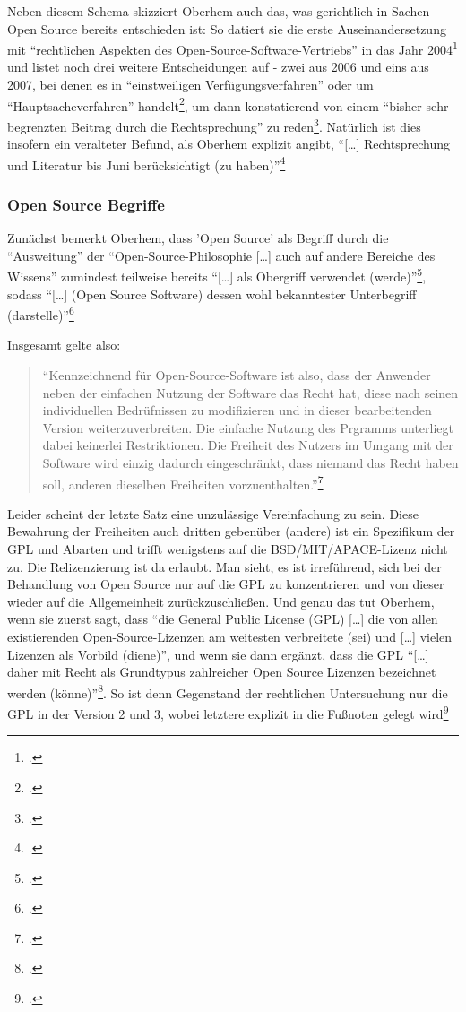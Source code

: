 \documentclass[DIV=calc,BCOR=5mm,11pt,headings=small,oneside,abstract=true, toc=bib]{scrartcl}
\begin{document}
Neben diesem Schema skizziert Oberhem auch das, was gerichtlich in Sachen Open
Source bereits entschieden ist: So datiert sie die erste
Auseinandersetzung mit \enquote{rechtlichen Aspekten des
Open-Source-Software-Vertriebs} in das Jahr
2004\footcite[vgl.][2]{Oberhem2008a} und listet noch drei weitere Entscheidungen
auf - zwei aus 2006 und eins aus 2007, bei denen es in
\enquote{einstweiligen Verfügungsverfahren} oder um
\enquote{Hauptsacheverfahren} handelt\footcite[vgl.][2f]{Oberhem2008a}, um
dann konstatierend von einem \enquote{bisher sehr begrenzten Beitrag durch
die Rechtsprechung} zu reden\footcite[vgl.][3]{Oberhem2008a}. Natürlich
ist dies insofern ein veralteter Befund, als Oberhem explizit angibt,
\enquote{[\ldots] Rechtsprechung und Literatur bis Juni berücksichtigt (zu
haben)}\footcite[vgl.][V = Vorwort]{Oberhem2008a}

\subsubsection{Open Source Begriffe}

Zunächst bemerkt Oberhem, dass 'Open Source' als Begriff durch die
\enquote{Ausweitung} der \enquote{Open-Source-Philosophie [\ldots] auch auf
andere Bereiche des Wissens} zumindest teilweise bereits \enquote{[\ldots]
als Obergriff verwendet (werde)}\footcite[vgl.][5]{Oberhem2008a}, sodass
\enquote{[\ldots] (Open Source Software) dessen wohl bekanntester Unterbegriff
(darstelle)}\footcite[vgl.][5f]{Oberhem2008a}

Insgesamt gelte also:

\begin{quote} \enquote{Kennzeichnend für Open-Source-Software ist also,
dass der Anwender neben der einfachen Nutzung der Software das Recht hat,
diese nach seinen individuellen Bedrüfnissen zu modifizieren und in
dieser bearbeitenden Version weiterzuverbreiten. Die einfache Nutzung des
Prgramms unterliegt dabei keinerlei Restriktionen. Die Freiheit des
Nutzers im Umgang mit der Software wird einzig dadurch eingeschränkt, dass
niemand das Recht haben soll, anderen dieselben Freiheiten
vorzuenthalten.}\footcite[vgl.][7]{Oberhem2008a}
\end{quote}

Leider scheint der letzte Satz eine unzulässige Vereinfachung zu sein. Diese
Bewahrung der Freiheiten auch dritten gebenüber (andere) ist ein Spezifikum der
GPL und Abarten und trifft wenigstens auf die BSD/MIT/APACE-Lizenz nicht zu. Die
Relizenzierung ist da erlaubt. Man sieht, es ist irreführend, sich bei der
Behandlung von Open Source nur auf die GPL zu konzentrieren und von dieser
wieder auf die Allgemeinheit zurückzuschließen. Und genau das tut Oberhem, wenn
sie zuerst sagt, dass \enquote{die General Public License (GPL) [\ldots] die von
allen existierenden Open-Source-Lizenzen am weitesten verbreitete (sei)
und [\ldots] vielen Lizenzen als Vorbild (diene)}, und wenn sie dann
ergänzt, dass die GPL \enquote{[\ldots] daher mit Recht als Grundtypus
zahlreicher Open Source Lizenzen bezeichnet werden
(könne)}\footcite[vgl.][33]{Oberhem2008a}. So ist denn Gegenstand der
rechtlichen Untersuchung nur die GPL in der Version 2 und 3, wobei letztere
explizit in die Fußnoten gelegt wird\footcite[vgl.][34]{Oberhem2008a}
\end{document}
